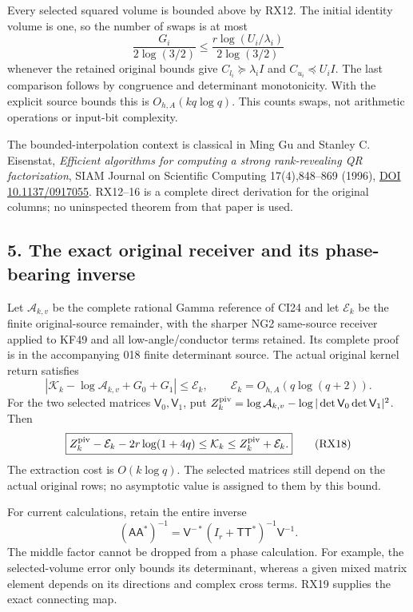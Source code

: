 \documentclass[11pt]{article}
\begin{document}
Every selected squared volume is bounded above by RX12. The initial identity volume is one, so the number of swaps is at most \[
\frac{G_i}{2\log(3/2)}
\le\frac{r\log(U_i/\lambda_i)}{2\log(3/2)}
\tag{RX16}
\] whenever the retained original bounds give \(C_{l_i}\succeq\lambda_iI\) and \(C_{u_i}\preceq U_iI\). The last comparison follows by congruence and determinant monotonicity. With the explicit source bounds this is \(O_{h,A}(kq\log q)\). This counts swaps, not arithmetic operations or input-bit complexity.

The bounded-interpolation context is classical in Ming Gu and Stanley C. Eisenstat, \emph{Efficient algorithms for computing a strong rank-revealing QR factorization}, SIAM Journal on Scientific Computing 17(4),848--869 (1996), \href{https://doi.org/10.1137/0917055}{DOI 10.1137/0917055}. RX12--16 is a complete direct derivation for the original columns; no uninspected theorem from that paper is used.

\subsection{5. The exact original receiver and its phase-bearing inverse}\label{the-exact-original-receiver-and-its-phase-bearing-inverse}

Let \(\mathcal A_{k,v}\) be the complete rational Gamma reference of CI24 and let \(\mathcal E_k\) be the finite original-source remainder, with the sharper NG2 same-source receiver applied to KF49 and all low-angle/conductor terms retained. Its complete proof is in the accompanying 018 finite determinant source. The actual original kernel return satisfies \[
|\mathcal K_k-\log\mathcal A_{k,v}+G_0+G_1|\le\mathcal E_k,
\qquad\mathcal E_k=O_{h,A}(q\log(q+2)).
\tag{RX17}
\] For the two selected matrices \(\mathsf V_0,\mathsf V_1\), put \(Z_k^{\rm piv}=\log\mathcal A_{k,v}-\log|\det\mathsf V_0\det\mathsf V_1|^2\). Then \[
\boxed{Z_k^{\rm piv}-\mathcal E_k-2r\log(1+4q)
\le\mathcal K_k\le Z_k^{\rm piv}+\mathcal E_k.}
\tag{RX18}
\] The extraction cost is \(O(k\log q)\). The selected matrices still depend on the actual original rows; no asymptotic value is assigned to them by this bound.

For current calculations, retain the entire inverse \[
(\mathsf A\mathsf A^*)^{-1}
=\mathsf V^{-*}(I_r+\mathsf T\mathsf T^*)^{-1}\mathsf V^{-1}.
\tag{RX19}
\] The middle factor cannot be dropped from a phase calculation. For example, the selected-volume error only bounds its determinant, whereas a given mixed matrix element depends on its directions and complex cross terms. RX19 supplies the exact connecting map.
\end{document}
